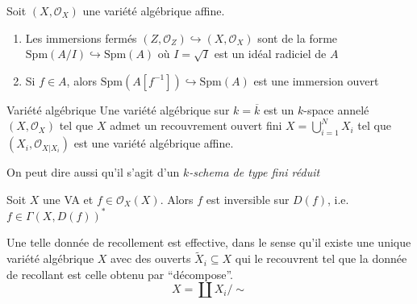 \begin{lemma}
    Soit \({(X, \mathcal{O}_X)}\) une variété algébrique affine.
\begin{enumerate}[label = \roman*)]
    \item Les immersions fermés \({(Z, \mathcal{O}_Z)} \hookrightarrow {(X,
        \mathcal{O}_X)}\) sont de la forme \(\mathrm{Spm}{\left( A / I \right)}
        \hookrightarrow \mathrm{Spm}{(A)}\) où \(I = \sqrt{I}\) est un idéal
        radiciel de \(A\) 
    \item Si \(f \in A\), alors \(\mathrm{Spm}{(A[f^{-1}])} \hookrightarrow
        \mathrm{Spm}{(A)}\) est une immersion ouvert
\end{enumerate}

\end{lemma}

\begin{definition}{Variété algébrique}
    Une variété algébrique sur \(k = \overline{k}\) est un \(k\)-space annelé
    \({(X, \mathcal{O}_X)}\) tel que \(X\) admet un recouvrement ouvert fini \(X
    = \bigcup_{i=1} ^{N}X_{i}\) tel que \({(X_{i}, \mathcal{O}_{X | X_{i}} )}\)
    est une variété algébrique affine.
\end{definition}

\begin{note}{}
    On peut dire aussi qu'il s'agit d'un \emph{\(k\)-schema de type fini réduit}
\end{note}

\begin{eser}{}
    Soit \(X\) une VA et \(f \in  \mathcal{O}_X{(X)}\). Alors \(f\) est
    inversible sur \(D{(f)}\), i.e. \(f \in  \Gamma{(X, D{(f)})}^{*}\) 
    \tcblower

\end{eser}


\begin{proposition}{}
    Une telle donnée de recollement est effective, dans le sense qu'il existe
    une unique variété algébrique \(X\) avec des ouverts \(\tilde{X}_i \subseteq
    X\) qui le recouvrent tel que la donnée de recollant est celle obtenu par
    ``décompose''.
    \[
      X = \coprod X_{i} / \sim 
    \]
\end{proposition}

